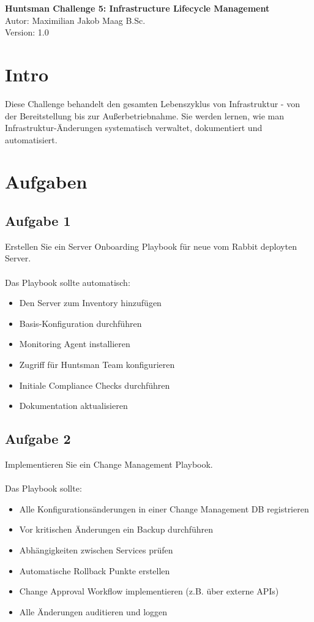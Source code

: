 \documentclass{article}
\begin{document}
    \begin{center}
        \Large \textbf{Huntsman Challenge 5: Infrastructure Lifecycle Management} \\ [6pt]
        \normalsize
        Autor: Maximilian Jakob Maag B.Sc. \\
        Version: 1.0
    \end{center}

    \section{Intro}
    Diese Challenge behandelt den gesamten Lebenszyklus von Infrastruktur - von der Bereitstellung bis zur Außerbetriebnahme.
    Sie werden lernen, wie man Infrastruktur-Änderungen systematisch verwaltet, dokumentiert und automatisiert.

    \section{Aufgaben}

    \subsection{Aufgabe 1}
    Erstellen Sie ein Server Onboarding Playbook für neue vom Rabbit deployten Server.
    \\ \\
    Das Playbook sollte automatisch:
    \begin{itemize}
        \item Den Server zum Inventory hinzufügen
        \item Basis-Konfiguration durchführen
        \item Monitoring Agent installieren
        \item Zugriff für Huntsman Team konfigurieren
        \item Initiale Compliance Checks durchführen
        \item Dokumentation aktualisieren
    \end{itemize}

    \subsection{Aufgabe 2}
    Implementieren Sie ein Change Management Playbook.
    \\ \\
    Das Playbook sollte:
    \begin{itemize}
        \item Alle Konfigurationsänderungen in einer Change Management DB registrieren
        \item Vor kritischen Änderungen ein Backup durchführen
        \item Abhängigkeiten zwischen Services prüfen
        \item Automatische Rollback Punkte erstellen
        \item Change Approval Workflow implementieren (z.B. über externe APIs)
        \item Alle Änderungen auditieren und loggen
    \end{itemize}
\end{document}
